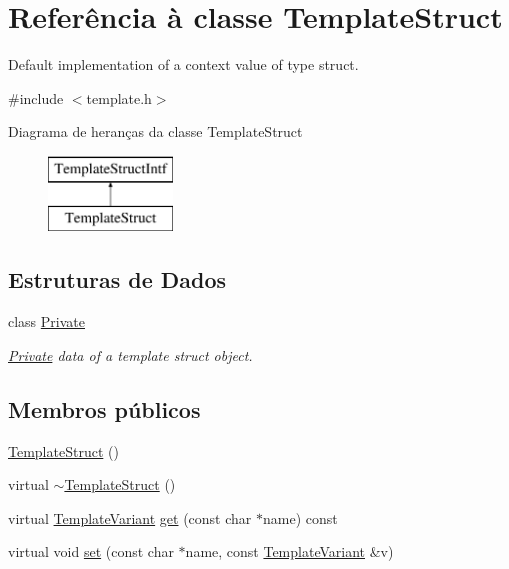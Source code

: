\hypertarget{class_template_struct}{\section{Referência à classe Template\-Struct}
\label{class_template_struct}
}


Default implementation of a context value of type struct.  




{\ttfamily \#include $<$template.\-h$>$}

Diagrama de heranças da classe Template\-Struct\begin{figure}[H]
\begin{center}
\leavevmode
\includegraphics[height=2.000000cm]{class_template_struct}
\end{center}
\end{figure}
\subsection*{Estruturas de Dados}
\begin{DoxyCompactItemize}
\item 
class \hyperlink{class_template_struct_1_1_private}{Private}
\begin{DoxyCompactList}\small\item\em \hyperlink{class_template_struct_1_1_private}{Private} data of a template struct object. \end{DoxyCompactList}\end{DoxyCompactItemize}
\subsection*{Membros públicos}
\begin{DoxyCompactItemize}
\item 
\hyperlink{class_template_struct_aae41203363f6a89d16ef8567ca2896a0}{Template\-Struct} ()
\item 
virtual \hyperlink{class_template_struct_ad5863893d5136a445576e6098e34a631}{$\sim$\-Template\-Struct} ()
\item 
virtual \hyperlink{class_template_variant}{Template\-Variant} \hyperlink{class_template_struct_a1bcfea01201f3ea09981a8442842c42d}{get} (const char $\ast$name) const 
\item 
virtual void \hyperlink{class_template_struct_a258e17f8e7e0f12f8cf405976214f489}{set} (const char $\ast$name, const \hyperlink{class_template_variant}{Template\-Variant} \&v)
\end{DoxyCompactItemize}


